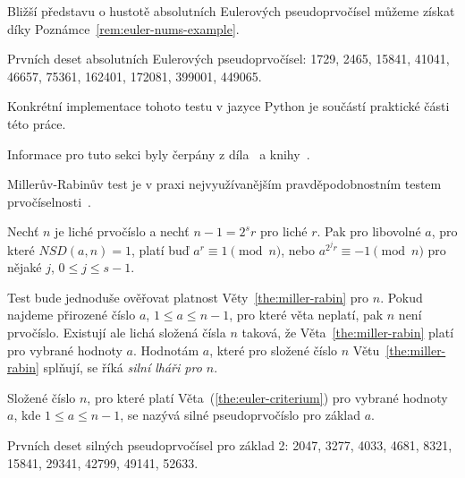 \documentclass[
  program=infoi,
  biblatex=false,
  figures=true,
  glossaries,
  tables=false,
  sourcecodes=true,
  index
]{kidiplom}
\begin{document}
            Bližší představu o hustotě absolutních Eulerových pseudoprvočísel můžeme získat díky Poznámce~\ref{rem:euler-nums-example}.

            \begin{remark}\label{rem:euler-nums-example}
                Prvních deset absolutních Eulerových pseudoprvočísel: 1729, 2465, 15841, 41041, 46657, 75361, 162401, 172081, 399001, 449065.
            \end{remark}

            Konkrétní implementace tohoto testu v jazyce Python je součástí praktické části této práce.


        \label{sss:miller-rabin}

            Informace pro tuto sekci byly čerpány z díla~\cite{computational-introduction} a knihy~\cite{handbook}.

            Millerův-Rabinův test je v praxi nejvyužívanějším pravděpodobnostním testem prvočíselnosti~\cite{handbook}.

            \begin{theorem}\label{the:miller-rabin}
                Nechť $n$ je liché prvočíslo a nechť $n-1 = 2^{s}r$ pro liché $r$.
                Pak pro libovolné $a$, pro které $NSD(a,n) = 1$, platí buď $a^r \equiv 1 \pmod{n}$, nebo $a^{2^{j}r} \equiv -1 \pmod{n}$
                pro nějaké $j$, $0 \leq j \leq s-1$.
            \end{theorem}

            Test bude jednoduše ověřovat platnost Věty~\ref{the:miller-rabin} pro $n$.
            Pokud najdeme přirozené číslo $a$, $1 \leq a \leq n-1$, pro které věta neplatí, pak
            $n$ není prvočíslo.
            Existují ale lichá složená čísla $n$ taková, že Věta~\ref{the:miller-rabin} platí pro vybrané hodnoty $a$.
            Hodnotám $a$, které pro složené číslo $n$ Větu~\ref{the:miller-rabin} splňují, se říká
            \emph{silní lháři pro $n$}.

            \begin{definition}
                Složené číslo $n$, pro které platí Věta~(\ref{the:euler-criterium}) pro vybrané hodnoty $a$, kde $1 \leq a \leq n-1$, se
                nazývá silné pseudoprvočíslo pro základ $a$.
            \end{definition}

            \begin{remark}\label{rem:strong-nums-example}
                Prvních deset silných pseudoprvočísel pro základ 2: 2047, 3277, 4033, 4681, 8321, 15841, 29341, 42799, 49141, 52633.
            \end{remark}
\end{document}
